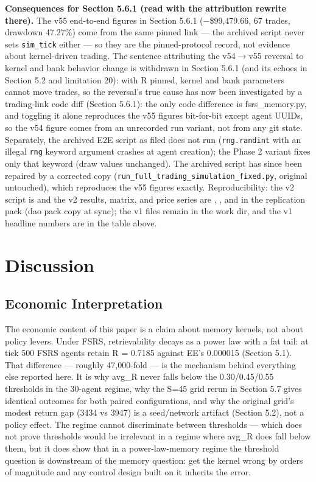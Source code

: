 \documentclass[11pt]{article}
\begin{document}
\textbf{Consequences for Section 5.6.1 (read with the attribution rewrite there).} The v55 end-to-end figures in Section 5.6.1 ($-$\$99,479.66, 67 trades, drawdown 47.27\%) come from the same pinned link --- the archived script never sets \texttt{sim\_tick} either --- so they are the pinned-protocol record, not evidence about kernel-driven trading. The sentence attributing the v54$\rightarrow$v55 reversal to kernel and bank behavior change is withdrawn in Section 5.6.1 (and its echoes in Section 5.2 and limitation 20): with R pinned, kernel and bank parameters cannot move trades, so the reversal's true cause has now been investigated by a trading-link code diff (Section 5.6.1): the only code difference is fsrs\_memory.py, and toggling it alone reproduces the v55 figures bit-for-bit except agent UUIDs, so the v54 figure comes from an unrecorded run variant, not from any git state. Separately, the archived E2E script as filed does not run (\texttt{rng.randint} with an illegal \texttt{rng} keyword argument crashes at agent creation); the Phase 2 variant fixes only that keyword (draw values unchanged). The archived script has since been repaired by a corrected copy (\texttt{run\_full\_trading\_simulation\_fixed.py}, original untouched), which reproduces the v55 figures exactly. Reproducibility: the v2 script is  and the v2 results, matrix, and price series are , , and  in the replication pack (dao pack copy at sync); the v1 files remain in the work dir, and the v1 headline numbers are in the table above.

\section{Discussion}
\subsection{Economic Interpretation}
The economic content of this paper is a claim about memory kernels, not about policy levers. Under FSRS, retrievability decays as a power law with a fat tail: at tick 500 FSRS agents retain R = 0.7185 against EE's 0.000015 (Section 5.1). That difference --- roughly 47,000-fold --- is the mechanism behind everything else reported here. It is why avg\_R never falls below the 0.30/0.45/0.55 thresholds in the 30-agent regime, why the S=45 grid rerun in Section 5.7 gives identical outcomes for both paired configurations, and why the original grid's modest return gap (3434 vs 3947) is a seed/network artifact (Section 5.2), not a policy effect. The regime cannot discriminate between thresholds --- which does not prove thresholds would be irrelevant in a regime where avg\_R does fall below them, but it does show that in a power-law-memory regime the threshold question is downstream of the memory question: get the kernel wrong by orders of magnitude and any control design built on it inherits the error.
\end{document}
